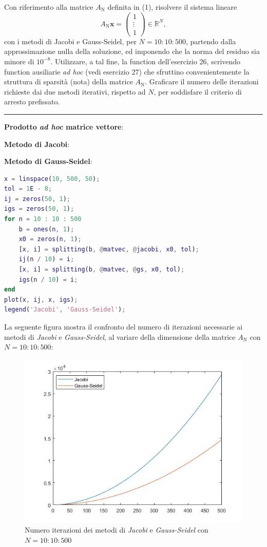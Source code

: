 Con riferimento alla matrice $A_\mathrm{N}$ definita in (1), risolvere il sistema lineare $$A_\mathrm{N}\textbf{x} = \begin{pmatrix}1 \\ \vdots \\ 1\end{pmatrix} \in\mathbb{R}^{N}, $$
con i metodi di Jacobi e Gauss-Seidel, per $N = 10 : 10 : 500$, partendo dalla approssimazione nulla della soluzione, ed imponendo che la norma del residuo sia minore di $10^{-8}$. Utilizzare, a tal fine, la function dell'esercizio 26, scrivendo function ausiliarie \textit{ad hoc} (vedi esercizio 27) che sfruttino convenientemente la struttura di sparsità (nota) della matrice $A_\mathrm{N}$. Graficare il numero delle iterazioni richieste dai due metodi iterativi, rispetto ad $N$, per soddisfare il criterio di arresto prefissato.
\hspace*{\fill}
\par\noindent\rule{\textwidth}{0.4pt}
\hspace*{\fill}

\textbf{Prodotto \textit{ad hoc} matrice vettore}:

\textbf{Metodo di Jacobi}:

\textbf{Metodo di Gauss-Seidel}:

\begin{lstlisting}[language=Matlab, caption=Codice Matlab]
x = linspace(10, 500, 50);
tol = 1E - 8;
ij = zeros(50, 1);
igs = zeros(50, 1);
for n = 10 : 10 : 500
    b = ones(n, 1);
    x0 = zeros(n, 1);
    [x, i] = splitting(b, @matvec, @jacobi, x0, tol);
    ij(n / 10) = i;
    [x, i] = splitting(b, @matvec, @gs, x0, tol);
    igs(n / 10) = i;
end
plot(x, ij, x, igs);
legend('Jacobi', 'Gauss-Seidel');
\end{lstlisting}
La seguente figura mostra il confronto del numero di iterazioni necessarie ai metodi di \textit{Jacobi} e \textit{Gauss-Seidel}, al variare della dimensione della matrice  $A_\mathrm{N}$ con $N = 10 : 10 : 500$:
\begin{figure}[H]
	\includegraphics[width=\textwidth]{Chapter-6/Exercise-28/plot.jpg}
	\caption*{Numero iterazioni dei metodi di \textit{Jacobi} e \textit{Gauss-Seidel} con $N = 10 : 10 : 500$}
\end{figure}
